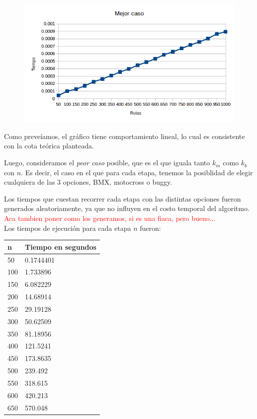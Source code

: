   \begin{figure}[h!]
   \begin{center}
 	\includegraphics[scale=0.8]{imagenes/ej1/mejorCaso.png}
   \end{center}
 \end{figure}
 
  Como preve\'iamos, el gr\'afico tiene comportamiento lineal, lo cual es consistente con la cota te\'orica planteada.
  
  \newpage
   
  Luego, consideramos el \emph{peor caso} posible, que es el que iguala tanto $k_m$ como $k_b$ con $n$.
  Es decir, el caso en el que para cada etapa, tenemos la posiblidad de elegir cualquiera de las 3 opciones, BMX, motocross o buggy.
  
  Los tiempos que cuestan recorrer cada etapa con las distintas opciones fueron generados aleatoriamente, ya que no influyen en el costo temporal del algoritmo. \textcolor{red}{Aca tambien poner como los generamos, si es una fiaca, pero bueno...}\\
  
  Los tiempos de ejecuci\'on para cada etapa $n$ fueron:
  
  \begin{table}[htb]
  \centering
  \begin{tabular}[c]{|l|l|}

		\hline
n & Tiempo en segundos\\
		\hline
50	&	0.1744401\\
		\hline
100	&	1.733896\\
		\hline
150	&	6.082229\\
		\hline
200	&	14.68914\\
		\hline
250	&	29.19128\\
		\hline
300	&	50.62509\\
		\hline
350	&	81.18956\\
		\hline
400	&	121.5241\\
		\hline
450	&	173.8635\\
		\hline
500	&	239.492\\
		\hline
550	&	318.615\\
		\hline
600	&	420.213\\
		\hline
650	&	570.048\\
		\hline

	\end{tabular}
	\end{table}
	
